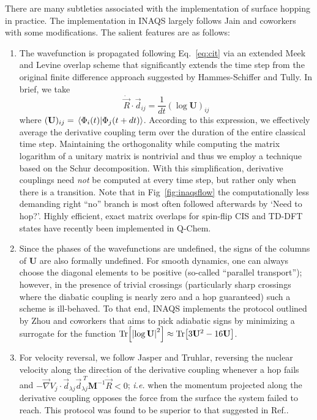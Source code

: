 \documentclass[journal=jctcce,manuscript=article,layout=traditional]{achemso}
\newcommand{\mat}[1]{\ensuremath{\mathbf{#1}}}
\newcommand{\refeq}[1]{Eq.~\ref{#1}}
\begin{document}
There are many subtleties associated with the implementation of surface hopping in practice.
The implementation in INAQS largely follows Jain and coworkers\cite{jain2016:afssh} with some modifications.
The salient features are as follows:
\begin{enumerate}
  \item The wavefunction is propagated following \refeq{eq:cit} via an extended  Meek and Levine overlap scheme\cite{meek2014:dcevaluation,jain2016:afssh} that significantly extends the time step from the original finite difference approach suggested by Hammes-Schiffer and Tully\cite{hammesschiffer1994:protontransfer,barbatti2009:overlaps}.
  In brief, we take 
  $$\dot{\vec{R}}\cdot \vec{d}_{ij} = \frac{1}{dt}{\left(\log \mat{U}\right)}_{ij} $$ where 
  $(\mat{U})_{ij} = \braket*{\Phi_i(t)}{\Phi_j(t+dt)}$.
  According to this expression, we effectively average the derivative coupling term over the duration of the entire classical time step.
  Maintaining the orthogonality while computing the matrix logarithm of a unitary matrix is nontrivial and thus we employ a technique based on the Schur decomposition.\cite{loring2014:matlog}
  With this simplification, derivative couplings need \emph{not} be computed at every time step, but rather only when there is a transition.
  Note that in Fig~\ref{fig:inaqsflow} the computationally less demanding right ``no'' branch is most often followed afterwards by  `Need to hop?'.
  Highly efficient, exact matrix overlaps for spin-flip CIS and TD-DFT states have recently been implemented in Q-Chem.\cite{chen2022:cisoverlaps}
  
  \item Since the phases of the wavefunctions are undefined, the signs of the columns of $\mat{U}$ are also formally undefined.  For smooth dynamics, one can always choose the diagonal elements to be positive (so-called ``parallel transport''); however, in the presence of trivial crossings\cite{zhou2020:overlaps,lee2019:trivialcrossing} (particularly sharp crossings where the diabatic coupling is nearly zero and a hop guaranteed) such a scheme is ill-behaved. To that end, INAQS implements the protocol outlined by Zhou and coworkers\cite{zhou2020:overlaps} that aims to pick adiabatic signs by minimizing a surrogate for the function $\Tr[\abs{\log \mat{U}}^2] \approx \Tr[3\mat{U}^2-16\mat{U}]$.

  
  \item For velocity reversal, we follow Jasper and Truhlar\cite{truhlar2003:reversal}, reversing the nuclear velocity along the direction of the derivative coupling whenever a hop fails and $-\vec{\nabla} V_{j} \cdot \vec{d}_{\lambda j} \vec{d}_{\lambda j}^{\;T} \mat{M}^{-1} \dot{\vec{R}}  < 0$; \emph{i.e.} when the momentum projected along the derivative coupling opposes the force from the surface the system failed to reach. This protocol was found to be superior \cite{jain2020:privcomm_reversal} to that suggested in Ref..
  

\end{enumerate}
\end{document}
